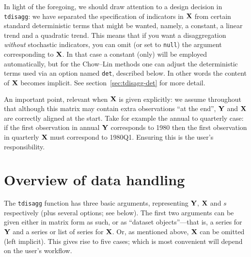 In light of the foregoing, we should draw attention to a design
decision in \texttt{tdisagg}: we have separated the specification of
indicators in $\mathbf{X}$ from certain standard deterministic terms that
might be wanted, namely, a constant, a linear trend and a quadratic
trend. This means that if you want a disaggregation \textit{without}
stochastic indicators, you can omit (or set to \texttt{null}) the
argument corresponding to $\mathbf{X}$. In that case a constant (only) will
be employed automatically, but for the Chow--Lin methods one can
adjust the deterministic terms used via an option named \texttt{det},
described below. In other words the content of $\mathbf{X}$ becomes
implicit. See section~\ref{sec:tdisagg-det} for more detail.

An important point, relevant when $\mathbf{X}$ is given explicitly: we assume
throughout that although this matrix may contain extra observations
``at the end'', $\mathbf{Y}$ and $\mathbf{X}$ are correctly aligned at the
start. Take for example the annual to quarterly case: if the first
observation in annual $\mathbf{Y}$ corresponds to 1980 then the first
observation in quarterly $\mathbf{X}$ must correspond to 1980Q1. Ensuring
this is the user's responsibility.

\section{Overview of data handling}
\label{sec:tdisagg-data}

The \texttt{tdisagg} function has three basic arguments, representing
$\mathbf{Y}$, $\mathbf{X}$ and $s$ respectively (plus several options; see
below). The first two arguments can be given either in matrix form as
such, or as ``dataset objects''---that is, a series for $\mathbf{Y}$ and a
series or list of series for $\mathbf{X}$. Or, as mentioned above, $\mathbf{X}$ can
be omitted (left implicit). This gives rise to five cases; which is
most convenient will depend on the user's workflow.


